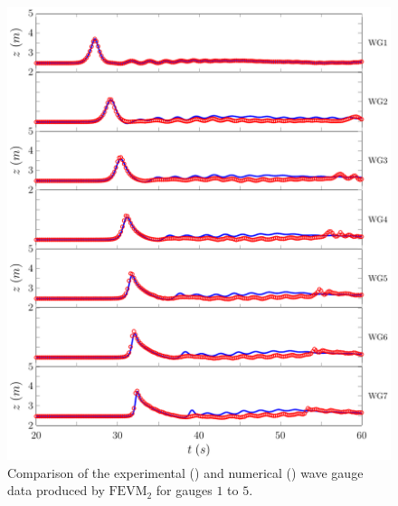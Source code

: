 \begin{figure}
	\centering
	\includegraphics[width=\textwidth]{./chp6/figures/Experiment/Roeber/Trial8/FEVM/LongWGs1.pdf}
	\caption{Comparison of the experimental () and numerical ({\color{blue}\solidrule}) wave gauge data produced by $\text{FEVM}_2$ for gauges $1$ to $5$.}
	\label{fig:Roeber8WG1to5FEVM}
\end{figure}
